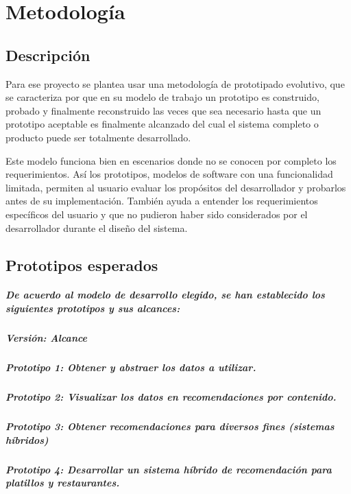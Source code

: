\clearpage
\chapter{Metodología}
\section{Descripción}
  Para ese proyecto se plantea usar una metodología de prototipado evolutivo, que se caracteriza por que en su modelo de trabajo un prototipo es construido, probado y finalmente reconstruido las veces que sea necesario hasta que un prototipo aceptable es finalmente alcanzado del cual el sistema completo o producto puede ser totalmente desarrollado.

  Este modelo funciona bien en escenarios donde no se conocen por completo los requerimientos. Así los prototipos, modelos de software con una funcionalidad limitada, permiten al usuario evaluar los propósitos del desarrollador y probarlos antes de su implementación. También ayuda a entender los requerimientos específicos del usuario y que no pudieron haber sido considerados por el desarrollador durante el diseño del sistema.

\section{Prototipos esperados}
  \paragraph{De acuerdo al modelo de desarrollo elegido, se han establecido los siguientes prototipos y sus alcances:}
  \paragraph{Versión: Alcance}
  \paragraph{Prototipo 1: Obtener y abstraer los datos a utilizar.}
  \paragraph{Prototipo 2: Visualizar los datos en recomendaciones por contenido.}
  \paragraph{Prototipo 3: Obtener recomendaciones para diversos fines (sistemas híbridos)}
  \paragraph{Prototipo 4: Desarrollar un sistema híbrido de recomendación para platillos y restaurantes.}

